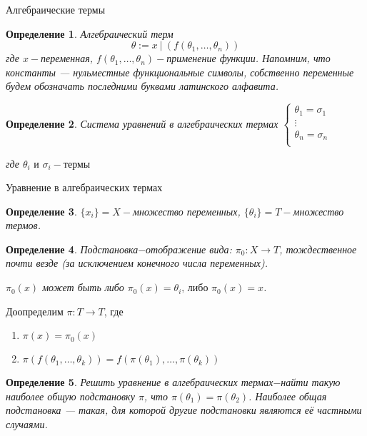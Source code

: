 \documentclass[aspectratio=169]{beamer}
\newtheorem{dfn}{Определение}[section]
\begin{document}
\begin{frame}{Алгебраические термы}
	\begin{dfn}Алгебраический терм $$\theta := x\:|\:(f(\theta_1,\ldots,\theta_n))$$ 
где $x-$переменная, $f(\theta_1,\ldots,\theta_n)-$применение функции. Напомним, что константы --- нульместные
функциональные символы, собственно переменные будем обозначать последними буквами латинского алфавита. \end{dfn}
	\begin{dfn}Система уравнений в алгебраических термах
	$
		\begin{cases}
			\theta_1=\sigma_1&\\
			\vdots&\\
			\theta_n=\sigma_n&\\
		\end{cases}
	$\par где $\theta_i \text{ и } \sigma_i-\text{термы}$\par
\end{dfn}
\end{frame}
\begin{frame}{Уравнение в алгебраических термах}
	\begin{dfn}$\{x_i\}=X-$множество переменных, $\{\theta_i\}=T-$множество термов.\end{dfn}
	\begin{dfn}Подстановка$-$отображение вида: $\pi_0:X\to T$, тождественное почти везде (за исключением конечного числа переменных).
        \par $\pi_0(x)$ может быть либо $\pi_0(x)=\theta_i\text{, либо }\pi_0(x)=x$.\end{dfn} 
	Доопределим $\pi:T\to T$, где \begin{enumerate}
		\item $\pi(x)=\pi_0(x)$
		\item $\pi(f(\theta_1, \ldots, \theta_k))=f(\pi(\theta_1), \ldots, \pi(\theta_k))$
	\end{enumerate}
	
	\begin{dfn}Решить уравнение в алгебраических термах$-$найти такую наиболее общую подстановку $\pi$, 
        что $\pi(\theta_1)=\pi(\theta_2)$.
Наиболее общая подстановка --- такая, для которой другие подстановки являются её частными случаями.\end{dfn} 
\end{frame}
\end{document}
